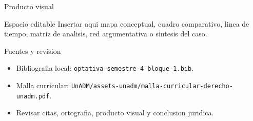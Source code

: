 \documentclass[
  spanish,
  aspectratio=169,
  xcolor={dvipsnames,table}
]{beamer}
\begin{document}
\begin{frame}{Producto visual}
  \begin{block}{Espacio editable}
    Insertar aqui mapa conceptual, cuadro comparativo, linea de tiempo,
    matriz de analisis, red argumentativa o sintesis del caso.
  \end{block}
  \centering
\end{frame}

\begin{frame}{Fuentes y revision}
  \begin{itemize}
    \item Bibliografia local: \texttt{optativa-semestre-4-bloque-1.bib}.
    \item Malla curricular: \texttt{UnADM/assets-unadm/malla-curricular-derecho-unadm.pdf}.
    \item Revisar citas, ortografia, producto visual y conclusion juridica.
  \end{itemize}
\end{frame}
\end{document}
